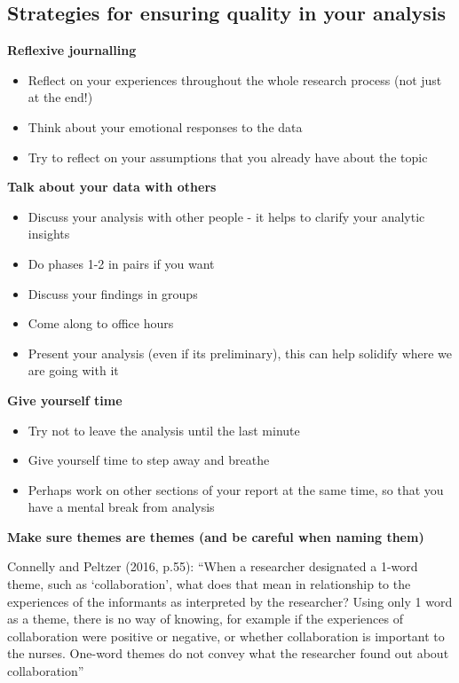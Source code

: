 \documentclass[
  english,
  letterpaper,
  DIV=11,
  numbers=noendperiod]{scrreprt}
\providecommand{\tightlist}{%
  \setlength{\itemsep}{0pt}\setlength{\parskip}{0pt}}
\begin{document}
\subsection{Strategies for ensuring quality in your
analysis}\label{strategies-for-ensuring-quality-in-your-analysis}

\textbf{Reflexive journalling}

\begin{itemize}
\tightlist
\item
  Reflect on your experiences throughout the whole research process (not
  just at the end!)
\item
  Think about your emotional responses to the data
\item
  Try to reflect on your assumptions that you already have about the
  topic
\end{itemize}

\textbf{Talk about your data with others}

\begin{itemize}
\tightlist
\item
  Discuss your analysis with other people - it helps to clarify your
  analytic insights
\item
  Do phases 1-2 in pairs if you want
\item
  Discuss your findings in groups
\item
  Come along to office hours
\item
  Present your analysis (even if its preliminary), this can help
  solidify where we are going with it
\end{itemize}

\textbf{Give yourself time}

\begin{itemize}
\tightlist
\item
  Try not to leave the analysis until the last minute
\item
  Give yourself time to step away and breathe
\item
  Perhaps work on other sections of your report at the same time, so
  that you have a mental break from analysis
\end{itemize}

\textbf{Make sure themes are themes (and be careful when naming them)}

Connelly and Peltzer (2016, p.55): ``When a researcher designated a
1-word theme, such as `collaboration', what does that mean in
relationship to the experiences of the informants as interpreted by the
researcher? Using only 1 word as a theme, there is no way of knowing,
for example if the experiences of collaboration were positive or
negative, or whether collaboration is important to the nurses. One-word
themes do not convey what the researcher found out about collaboration''
\end{document}
